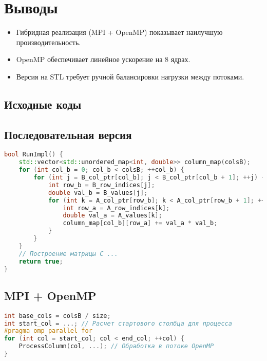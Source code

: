 \documentclass[12pt]{article}
\begin{document}
\section{Выводы}
\begin{itemize}
    \item Гибридная реализация (MPI + OpenMP) показывает наилучшую производительность.
    \item OpenMP обеспечивает линейное ускорение на 8 ядрах.
    \item Версия на STL требует ручной балансировки нагрузки между потоками.
\end{itemize}

\newpage
\begin{appendices}
\section{Исходные коды}
\subsection{Последовательная версия}
\begin{lstlisting}[language=C++, caption=RunImpl из ops\_seq.cpp]
bool RunImpl() {
    std::vector<std::unordered_map<int, double>> column_map(colsB);
    for (int col_b = 0; col_b < colsB; ++col_b) {
        for (int j = B_col_ptr[col_b]; j < B_col_ptr[col_b + 1]; ++j) {
            int row_b = B_row_indices[j];
            double val_b = B_values[j];
            for (int k = A_col_ptr[row_b]; k < A_col_ptr[row_b + 1]; ++k) {
                int row_a = A_row_indices[k];
                double val_a = A_values[k];
                column_map[col_b][row_a] += val_a * val_b;
            }
        }
    }
    // Построение матрицы C ...
    return true;
}
\end{lstlisting}

\subsection{MPI + OpenMP}
\begin{lstlisting}[language=C++, caption=Распределение столбцов в MPI]
int base_cols = colsB / size;
int start_col = ...; // Расчет стартового столбца для процесса
#pragma omp parallel for
for (int col = start_col; col < end_col; ++col) {
    ProcessColumn(col, ...); // Обработка в потоке OpenMP
}
\end{lstlisting}
\end{appendices}
\end{document}
